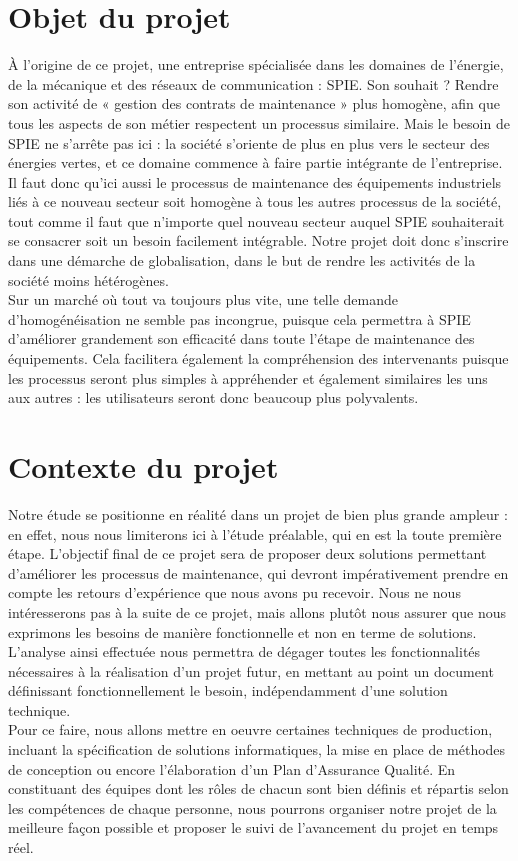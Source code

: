 \section{Objet du projet}

À l'origine de ce projet, une entreprise spécialisée dans les domaines de l'énergie, de la mécanique et des réseaux de communication : SPIE. Son souhait ? Rendre son activité de « gestion des contrats de maintenance » plus homogène, afin que tous les aspects de son métier respectent un processus similaire. Mais le besoin de SPIE ne s'arrête pas ici : la société s'oriente de plus en plus vers le secteur des énergies vertes, et ce domaine commence à faire partie intégrante de l'entreprise. Il faut donc qu'ici aussi le processus de maintenance des équipements industriels liés à ce nouveau secteur soit homogène à tous les autres processus de la société, tout comme il faut que n'importe quel nouveau secteur auquel SPIE souhaiterait se consacrer soit un besoin facilement intégrable. Notre projet doit donc s'inscrire dans une démarche de globalisation, dans le but de rendre les activités de la société moins hétérogènes. \\
    
Sur un marché où tout va toujours plus vite, une telle demande d'homogénéisation ne semble pas incongrue, puisque cela permettra à SPIE d'améliorer grandement son efficacité dans toute l'étape de maintenance des équipements. Cela facilitera également la compréhension des intervenants puisque les processus seront plus simples à appréhender et également similaires les uns aux autres : les utilisateurs seront donc beaucoup plus polyvalents.

\section{Contexte du projet}

Notre étude se positionne en réalité dans un projet de bien plus grande ampleur : en effet, nous nous limiterons ici à l'étude préalable, qui en est la toute première étape. L'objectif final de ce projet sera de proposer deux solutions permettant d'améliorer les processus de maintenance, qui devront impérativement prendre en compte les retours d'expérience que nous avons pu recevoir. Nous ne nous intéresserons pas à la suite de ce projet, mais allons plutôt nous assurer que nous exprimons les besoins de manière fonctionnelle et non en terme de solutions. L'analyse ainsi effectuée nous permettra de dégager toutes les fonctionnalités nécessaires à la réalisation d'un projet futur, en mettant au point un document définissant fonctionnellement le besoin, indépendamment d'une solution technique. \\
    
Pour ce faire, nous allons mettre en oeuvre certaines techniques de production, incluant la spécification de solutions informatiques, la mise en place de méthodes de conception ou encore l’élaboration d’un Plan d’Assurance Qualité. En constituant des équipes dont les rôles de chacun sont bien définis et répartis selon les compétences de chaque personne, nous pourrons organiser notre projet de la meilleure façon possible et proposer le suivi de l’avancement du projet en temps réel.

